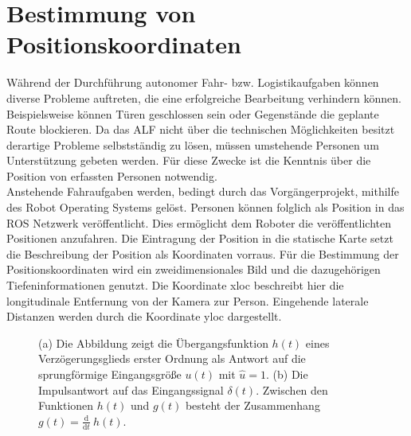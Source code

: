 	
		
		
	\section{Bestimmung von Positionskoordinaten}
	\label{sec: Bestimmung der Positionskoordinaten}
		Während der Durchführung autonomer Fahr- bzw. Logistikaufgaben können diverse Probleme auftreten, die eine erfolgreiche Bearbeitung verhindern können. Beispielsweise können Türen geschlossen sein oder Gegenstände die geplante Route blockieren. Da das ALF nicht über die technischen Möglichkeiten besitzt derartige Probleme selbstständig zu lösen, müssen umstehende Personen um Unterstützung gebeten werden. Für diese Zwecke ist die Kenntnis über die Position von erfassten Personen notwendig.\\
		
		Anstehende Fahraufgaben werden, bedingt durch das Vorgängerprojekt, mithilfe des Robot Operating Systems gelöst. Personen können folglich als Position in das ROS Netzwerk veröffentlicht. Dies ermöglicht dem Roboter die veröffentlichten Positionen anzufahren. Die Eintragung der Position in die statische Karte setzt die Beschreibung der Position als Koordinaten vorraus. Für die Bestimmung der Positionskoordinaten wird ein zweidimensionales Bild und die dazugehörigen Tiefeninformationen genutzt. Die Koordinate xloc beschreibt hier die longitudinale Entfernung von der Kamera zur Person. Eingehende laterale Distanzen werden durch die Koordinate yloc dargestellt.
		
	\begin{figure}[H]
		\centering
		
		\caption{(a) Die Abbildung zeigt die Übergangsfunktion $h(t)$ eines Verzögerungsglieds erster Ordnung als Antwort auf die sprungförmige Eingangsgröße $u(t)$ mit $\hat{u}=1$. (b) Die Impulsantwort auf das Eingangssignal $\delta(t)$. Zwischen den Funktionen $h(t)$ und $g(t)$ besteht der Zusammenhang \mbox{$g(t)=\frac{\mathrm d}{\mathrm d t}\:h(t)$}.}
		\label{fig: antworten}
	\end{figure}


	     
	

